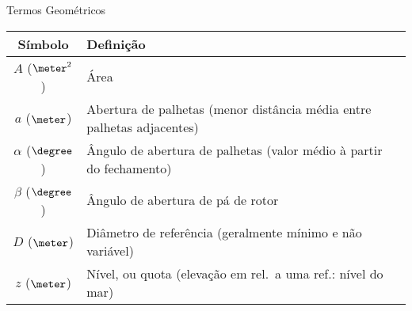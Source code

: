     \begin{frame}{Termos Geométricos}\vspace*{-1em}
        \setlength{\tabcolsep}{2mm}
        \noindent\begin{longtable}{cp{110mm}}
            \alert{Símbolo} & \alert{Definição} \\
            \hline
            $A$ ($\meter^2$) &
            Área \\
            $a$ ($\meter$) &
            Abertura de palhetas (menor distância média entre palhetas adjacentes) \\
            $\alpha$ ($\degree$) &
            Ângulo de abertura de palhetas (valor médio à partir do fechamento) \\
            $\beta$ ($\degree$) &
            Ângulo de abertura de pá de rotor \\
            $D$ ($\meter$) &
            Diâmetro de referência (geralmente mínimo e não variável) \\
            $z$ ($\meter$) &
            Nível, ou quota (elevação em rel.~a uma ref.: nível do mar) \\
            \hline
        \end{longtable}
    \end{frame}

    \begin{frame}\vspace*{-1em}
    \end{frame}

